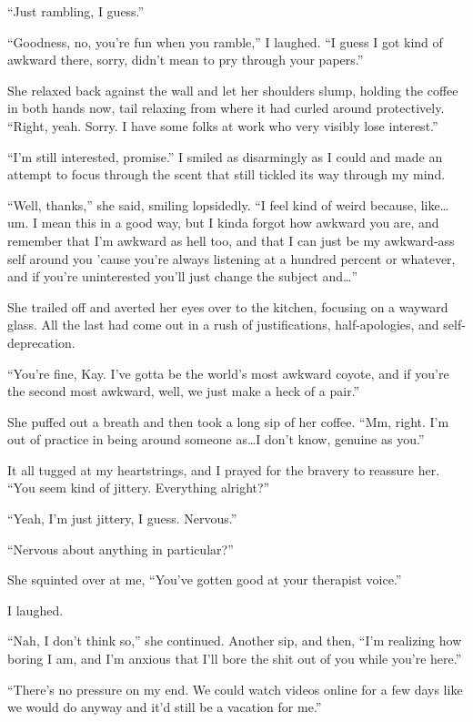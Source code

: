 ``Just rambling, I guess.''

``Goodness, no, you're fun when you ramble,'' I laughed. ``I guess I got kind of awkward there, sorry, didn't mean to pry through your papers.''

She relaxed back against the wall and let her shoulders slump, holding the coffee in both hands now, tail relaxing from where it had curled around protectively. ``Right, yeah. Sorry. I have some folks at work who very visibly lose interest.''

``I'm still interested, promise.'' I smiled as disarmingly as I could and made an attempt to focus through the scent that still tickled its way through my mind.

``Well, thanks,'' she said, smiling lopsidedly. ``I feel kind of weird because, like\ldots um. I mean this in a good way, but I kinda forgot how awkward you are, and remember that I'm awkward as hell too, and that I can just be my awkward-ass self around you 'cause you're always listening at a hundred percent or whatever, and if you're uninterested you'll just change the subject and\ldots{}''

She trailed off and averted her eyes over to the kitchen, focusing on a wayward glass. All the last had come out in a rush of justifications, half-apologies, and self-deprecation.

``You're fine, Kay. I've gotta be the world's most awkward coyote, and if you're the second most awkward, well, we just make a heck of a pair.''

She puffed out a breath and then took a long sip of her coffee. ``Mm, right. I'm out of practice in being around someone as\ldots I don't know, genuine as you.''

It all tugged at my heartstrings, and I prayed for the bravery to reassure her. ``You seem kind of jittery. Everything alright?''

``Yeah, I'm just jittery, I guess. Nervous.''

``Nervous about anything in particular?''

She squinted over at me, ``You've gotten good at your therapist voice.''

I laughed.

``Nah, I don't think so,'' she continued. Another sip, and then, ``I'm realizing how boring I am, and I'm anxious that I'll bore the shit out of you while you're here.''

``There's no pressure on my end. We could watch videos online for a few days like we would do anyway and it'd still be a vacation for me.''

